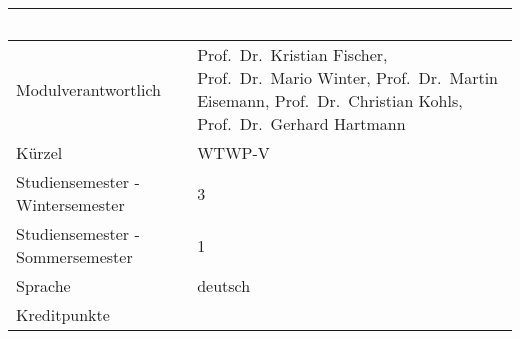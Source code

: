 \begin{longtable}[]{@{}ll@{}}
\toprule
\begin{minipage}[b]{0.12\columnwidth}\raggedright\strut
~\strut
\end{minipage} & \begin{minipage}[b]{0.12\columnwidth}\raggedright\strut
~\strut
\end{minipage}\tabularnewline
\midrule
\endhead
\begin{minipage}[t]{0.12\columnwidth}\raggedright\strut
Modulverantwortlich\strut
\end{minipage} & \begin{minipage}[t]{0.12\columnwidth}\raggedright\strut
Prof.~Dr.~Kristian Fischer, Prof.~Dr.~Mario Winter, Prof.~Dr.~Martin
Eisemann, Prof.~Dr.~Christian Kohls, Prof.~Dr.~Gerhard Hartmann\strut
\end{minipage}\tabularnewline
\begin{minipage}[t]{0.12\columnwidth}\raggedright\strut
Kürzel\strut
\end{minipage} & \begin{minipage}[t]{0.12\columnwidth}\raggedright\strut
WTWP-V\strut
\end{minipage}\tabularnewline
\begin{minipage}[t]{0.12\columnwidth}\raggedright\strut
Studiensemester - Wintersemester\strut
\end{minipage} & \begin{minipage}[t]{0.12\columnwidth}\raggedright\strut
3\strut
\end{minipage}\tabularnewline
\begin{minipage}[t]{0.12\columnwidth}\raggedright\strut
Studiensemester - Sommersemester\strut
\end{minipage} & \begin{minipage}[t]{0.12\columnwidth}\raggedright\strut
1\strut
\end{minipage}\tabularnewline
\begin{minipage}[t]{0.12\columnwidth}\raggedright\strut
Sprache\strut
\end{minipage} & \begin{minipage}[t]{0.12\columnwidth}\raggedright\strut
deutsch\strut
\end{minipage}\tabularnewline
\begin{minipage}[t]{0.12\columnwidth}\raggedright\strut
Kreditpunkte\strut
\end{minipage} & \begin{minipage}[t]{0.12\columnwidth}\raggedright\strut

\end{minipage}
\end{longtable}

